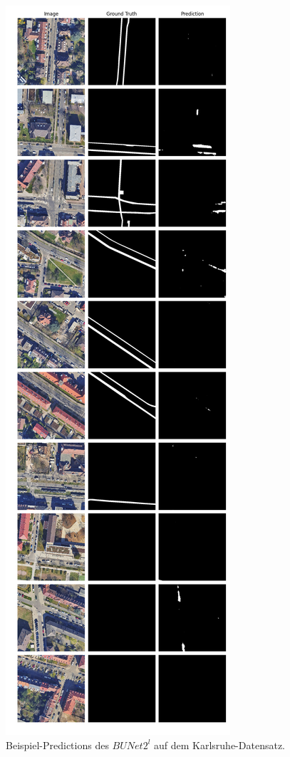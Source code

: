 \begin{figure}
	\centering
	\includegraphics[width=.41\textwidth]{Bilder/Samples-KA/bunet2-l.png} 
	\caption{Beispiel-Predictions des $BUNet2^l$ auf dem Karlsruhe-Datensatz.}
	\label{fig:ka-samples-bunet2-l}
\end{figure}

